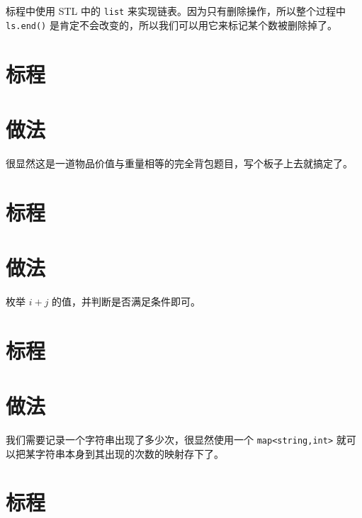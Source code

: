 \documentclass{ctsol}
\begin{document}
标程中使用 STL 中的 \verb|list| 来实现链表。因为只有删除操作，所以整个过程中 \verb|ls.end()| 是肯定不会改变的，所以我们可以用它来标记某个数被删除掉了。

\section*{标程}

\makesolution
\section*{做法}

很显然这是一道物品价值与重量相等的完全背包题目，写个板子上去就搞定了。

\section*{标程}

\makesolution
\section*{做法}

枚举 $i+j$ 的值，并判断是否满足条件即可。

\section*{标程}

\makesolution
\section*{做法}

我们需要记录一个字符串出现了多少次，很显然使用一个 \verb|map<string,int>| 就可以把某字符串本身到其出现的次数的映射存下了。

\section*{标程}
\end{document}
